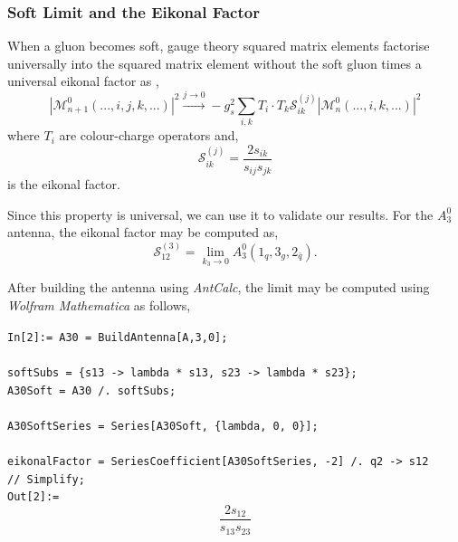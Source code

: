\subsubsection*{Soft Limit and the Eikonal Factor}

When a gluon becomes soft, gauge theory squared matrix elements factorise universally into the
squared matrix element without the soft gluon times a universal eikonal factor as \cite{Catani:1996vz},
\begin{equation}
    |\mathcal M_{n+1}^0(...,i,j,k,...)|^2\xrightarrow{j\to0}-g_s^2\sum_{i,k}T_i\cdot T_k \mathcal S_{ik}^{(j)}|\mathcal M_{n}^0(...,i,k,...)|^2
\end{equation}
where $T_i$ are colour-charge operators and,
\begin{equation}
    \mathcal S_{ik}^{(j)} = \frac{2s_{ik}}{s_{ij}s_{jk}}
\end{equation}
is the eikonal factor.

Since this property is universal, we can use it to validate our results. For the 
$A_3^0$ antenna, the eikonal factor may be computed as,
\begin{equation}
    \mathcal S_{12}^{(3)} = \lim_{k_3\to0}A_3^0(1_q, 3_g, 2_{\bar q}).
\end{equation}

After building the antenna using \textit{AntCalc}, the limit may be computed using 
\textit{Wolfram Mathematica} as follows,

\begin{mdframed}[backgroundcolor=gray!10, linewidth=0pt]
    \texttt{In[2]:= A30 = BuildAntenna[A,3,0];\\
                    \\
                    softSubs = \{s13 -> lambda * s13, s23 -> lambda * s23\};\\
                    A30Soft = A30 /. softSubs;\\
                    \\
                    A30SoftSeries = Series[A30Soft, \{lambda, 0, 0\}];\\
                    \\
                    eikonalFactor = SeriesCoefficient[A30SoftSeries, -2] /. q2 -> s12\\ 
                    // Simplify;}\\
    \hfill
    \texttt{Out[2]:=}
        \begin{equation*}
            \frac{2s_{12}}{s_{13}s_{23}}
        \end{equation*}
\end{mdframed}

